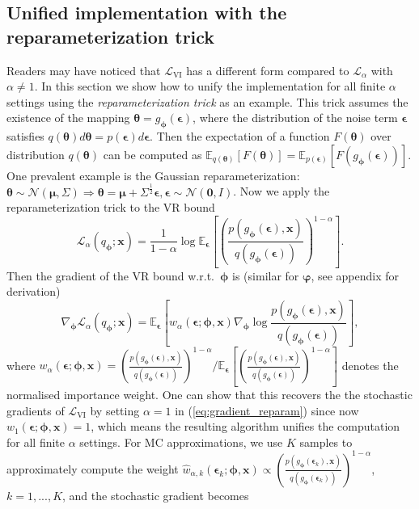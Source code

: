 \subsection{Unified implementation with the reparameterization trick}

Readers may have noticed that $\mathcal{L}_{\text{VI}}$ has a different form compared to $\mathcal{L}_{\alpha}$ with $\alpha \neq 1$. In this section we show how to unify the implementation for all finite $\alpha$ settings using the \emph{reparameterization trick} \cite{salimans:reparam, kingma:vae} as an example. This trick assumes the existence of the mapping $\bm{\theta} = g_{\bm{\phi}}(\bm{\epsilon})$, where the distribution of the noise term $\bm{\epsilon}$ satisfies $q(\bm{\theta}) d\bm{\theta} = p(\bm{\epsilon}) d\bm{\epsilon}$. Then the expectation of a function $F(\bm{\theta})$ over distribution $q(\bm{\theta})$ can be computed as
%
$\mathbb{E}_{q(\bm{\theta})} [F(\bm{\theta})] = \mathbb{E}_{p(\bm{\epsilon})} [F(g_{\bm{\phi}}(\bm{\epsilon}))].$
%
One prevalent example is the Gaussian reparameterization: $\bm{\theta} \sim \mathcal{N}(\bm{\mu}, \Sigma) \Rightarrow \bm{\theta} = \bm{\mu} + \Sigma^{ \frac{1}{2} } \bm{\epsilon}, \bm{\epsilon} \sim \mathcal{N}(\bm{0}, I)$. 
%
Now we apply the reparameterization trick to the VR bound
%
\begin{equation}
\mathcal{L}_{\alpha}(q_{\bm{\phi}}; \bm{x}) = \frac{1}{1 - \alpha} \log \mathbb{E}_{\bm{\epsilon}} \left[\left( \frac{p(g_{\bm{\phi}}(\bm{\epsilon}) , \bm{x})}{q(g_{\bm{\phi}}(\bm{\epsilon}))} \right)^{1 - \alpha} \right].
\end{equation}
%
Then the gradient of the VR bound w.r.t.~$\bm{\phi}$ is (similar for $\bm{\varphi}$, see appendix for derivation)
\begin{equation}
\nabla_{\bm{\phi}} \mathcal{L}_{\alpha}(q_{\bm{\phi}}; \bm{x}) 
= \mathbb{E}_{\bm{\epsilon}} \left[ w_{\alpha}(\bm{\epsilon}; \bm{\phi}, \bm{x}) \nabla_{\bm{\phi}} \log \frac{p(g_{\bm{\phi}}(\bm{\epsilon}), \bm{x})}{q(g_{\bm{\phi}}(\bm{\epsilon}))} \right],
\label{eq:gradient_reparam}
\end{equation}
%
where $w_{\alpha}(\bm{\epsilon}; \bm{\phi}, \bm{x}) = \left( \frac{p(g_{\bm{\phi}}(\bm{\epsilon}), \bm{x})}{q(g_{\bm{\phi}}(\bm{\epsilon}))} \right)^{1 - \alpha} \bigg/ \mathbb{E}_{\bm{\epsilon}} \left[ \left( \frac{p(g_{\bm{\phi}}(\bm{\epsilon}), \bm{x})}{q(g_{\bm{\phi}}(\bm{\epsilon}))} \right)^{1 - \alpha} \right]$ denotes the normalised importance weight. 
%
One can show that this recovers the the stochastic gradients of $\mathcal{L}_{\text{VI}}$ by setting $\alpha = 1$ in (\ref{eq:gradient_reparam}) since now $w_{1}(\bm{\epsilon}; \bm{\phi}, \bm{x}) = 1$, which means the resulting algorithm unifies the computation for all finite $\alpha$ settings. For MC approximations, we use $K$ samples to approximately compute the weight $\hat{w}_{\alpha, k}(\bm{\epsilon}_k; \bm{\phi}, \bm{x}) \propto \left( \frac{p(g_{\bm{\phi}}(\bm{\epsilon}_k), \bm{x})}{q(g_{\bm{\phi}}(\bm{\epsilon}_k))} \right)^{1 - \alpha}$, $k = 1, ..., K$, and the stochastic gradient becomes
